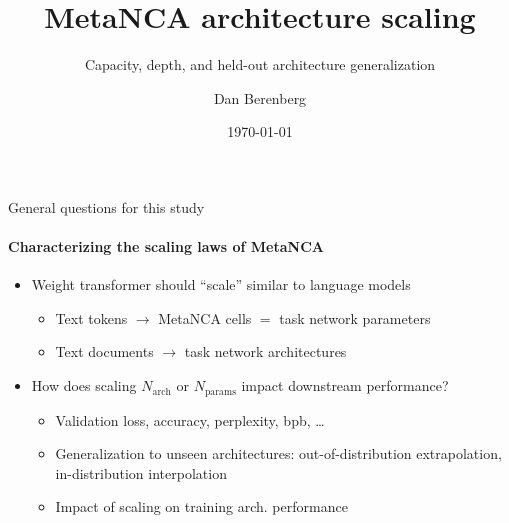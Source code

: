 \documentclass[aspectratio=169,11pt]{beamer}
\title[MetaNCA architecture scaling]{MetaNCA architecture scaling}
\subtitle{Capacity, depth, and held-out architecture generalization}
\author[D.~Berenberg]{Dan Berenberg}
\institute{Mythos Scientific}
\date{\today}
\begin{document}
\begin{frame}[plain]
  \titlepage
\end{frame}

\begin{frame}{General questions for this study}
  \framesubtitle{Characterizing the scaling laws of MetaNCA}

  \begin{itemize}
    \item Weight transformer should ``scale'' similar to language models
      \begin{itemize}
        \item Text tokens $\rightarrow$ MetaNCA cells $=$ task network parameters
        \item Text documents $\rightarrow$ task network architectures
      \end{itemize}
    \item How does scaling $N_\mathrm{arch}$ or $N_\mathrm{params}$ impact downstream performance?
        \begin{itemize}
            \item Validation loss, accuracy, perplexity, bpb, \ldots
            \item Generalization to unseen architectures: out-of-distribution extrapolation,
                in-distribution interpolation
            \item Impact of scaling on training arch. performance
        \end{itemize}
  \end{itemize}
\end{frame}
\end{document}
